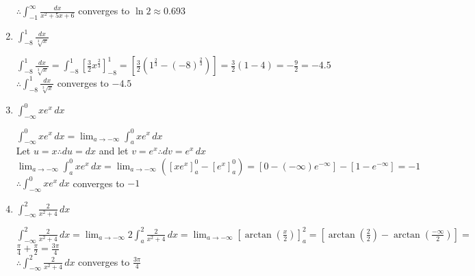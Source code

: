 \documentclass[10pt, letterpaper]{report}
\begin{document}
\begin{enumerate}
    $\therefore \int_{-1}^{\infty}{\frac{dx}{x^{2}+5x+6}}$ converges to $\ln{2}\approx 0.693$ \\
    \pagebreak 
    
  \item{$\int_{-8}^{1}{\frac{dx}{\sqrt[3]{x}}}$ \\}
  
    $\int_{-8}^{1}{\frac{dx}{\sqrt[3]{x}}}=
    \int_{-8}^{1}[\frac{3}{2}x^{\frac{2}{3}}]_{-8}^{1}=
    \left[\frac{3}{2}\left(1^{\frac{2}{3}}-(-8)^{\frac{2}{3}}\right)\right]=
    \frac{3}{2}\left(1-4\right)=-\frac{9}{2}=-4.5$ \\
    
    $\therefore \int_{-8}^{1}{\frac{dx}{\sqrt[3]{x}}}$ converges to $-4.5$ \\ 
    
  \item{$\int_{-\infty}^{0}{xe^{x}}\,dx$ \\}
  
    $\int_{-\infty}^{0}{xe^{x}}\,dx=
    \lim_{a\to-\infty}\int_{a}^{0}{xe^{x}}\,dx$ \\
    
    Let $u=x\therefore du=dx$ and let $v=e^{x}\therefore dv=e^{x}\,dx$ \\
    
    $\lim_{a\to-\infty}\int_{a}^{0}{xe^{x}}\,dx=
    \lim_{a\to-\infty}\left([xe^{x}]_{a}^{0}-[e^{x}]_{a}^{0}\right)=
    [0-(-\infty)e^{-\infty}]-[1-e^{-\infty}]=-1$ \\
    
    $\therefore \int_{-\infty}^{0}{xe^{x}}\,dx$ converges to $-1$ \\ 
    
  \item{$\int_{-\infty}^{2}{\frac{2}{x^{2}+4}}\,dx$ \\}
  
    $\int_{-\infty}^{2}{\frac{2}{x^{2}+4}}\,dx=
    \lim_{a\to-\infty}2\int_{a}^{2}{\frac{2}{x^{2}+4}}\,dx=
    \lim_{a\to-\infty}\left[\arctan{\left(\frac{x}{2}\right)}\right]_{a}^{2}=
    \left[\arctan{\left(\frac{2}{2}\right)}-\arctan{\left(\frac{-\infty}{2}\right)}\right]=$ \\
    
    $\frac{\pi}{4}+\frac{\pi}{2}=\frac{3\pi}{4}$ \\
    
    $\therefore \int_{-\infty}^{2}{\frac{2}{x^{2}+4}}\,dx$ converges to $\frac{3\pi}{4}$ \\ 
    
\end{enumerate}
\end{document}
